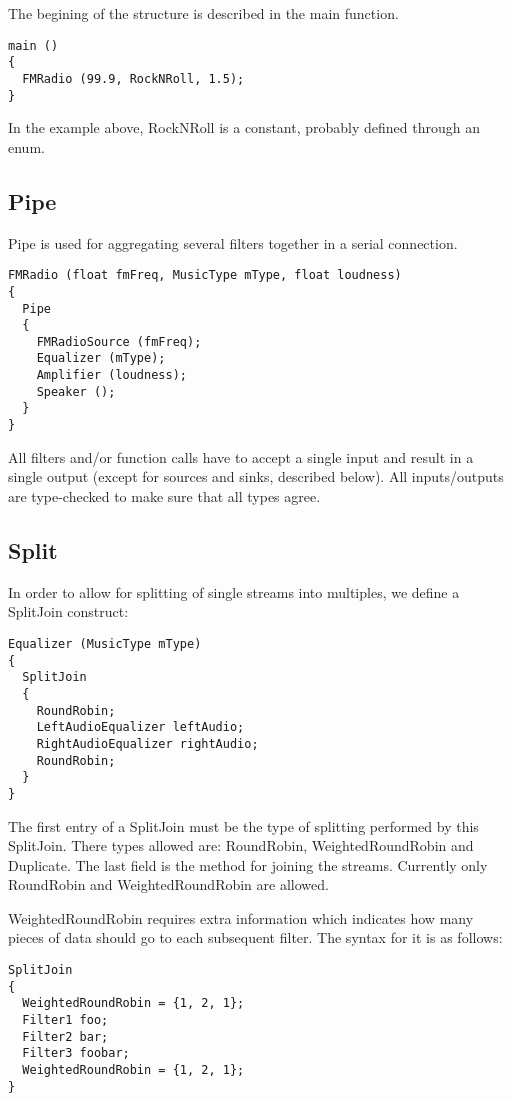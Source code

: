 \documentclass[twocolumn, draft]{article}
\begin{document}
The begining of the structure is described in the main function.

\begin{verbatim}
main ()
{
  FMRadio (99.9, RockNRoll, 1.5);
}
\end{verbatim}

In the example above, RockNRoll is a constant, probably defined through
an enum.

\subsection{Pipe}

Pipe is used for aggregating several filters together in a serial connection.

\begin{verbatim}
FMRadio (float fmFreq, MusicType mType, float loudness)
{
  Pipe
  {
    FMRadioSource (fmFreq);
    Equalizer (mType);
    Amplifier (loudness);
    Speaker ();
  }
}
\end{verbatim}

All filters and/or function calls have to accept a single input and result
in a single output (except for sources and sinks, described below).
All inputs/outputs are type-checked to make sure that
all types agree.

\subsection{Split}

In order to allow for splitting of single streams into multiples,
we define a SplitJoin construct:

\begin{verbatim}
Equalizer (MusicType mType)
{
  SplitJoin
  {
    RoundRobin;
    LeftAudioEqualizer leftAudio;
    RightAudioEqualizer rightAudio;
    RoundRobin;
  }
}
\end{verbatim}

The first entry of a SplitJoin must be the type of splitting performed
by this SplitJoin.  There types allowed are:  RoundRobin, WeightedRoundRobin
and Duplicate.  The last field is the method for joining the streams.  
Currently only RoundRobin and WeightedRoundRobin are allowed.

WeightedRoundRobin requires extra information which indicates how many
pieces of data should go to each subsequent filter.  The syntax for it
is as follows:

\begin{verbatim}
SplitJoin
{
  WeightedRoundRobin = {1, 2, 1};
  Filter1 foo;
  Filter2 bar;
  Filter3 foobar;
  WeightedRoundRobin = {1, 2, 1};
}
\end{verbatim}
\end{document}
